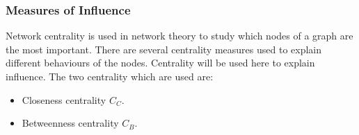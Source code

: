 \documentclass{article}
\theoremstyle{definition}
\begin{document}


\subsubsection{Measures of Influence}

Network centrality is used in network theory to study which nodes of a graph are
the most important. There are several centrality measures used to explain different
behaviours of the nodes. Centrality will be used here to explain influence. 
The two centrality which are used are:

\begin{itemize}
    \item Closeness centrality \(C_C\).
    \item Betweenness centrality \(C_B\).
\end{itemize}
\end{document}

